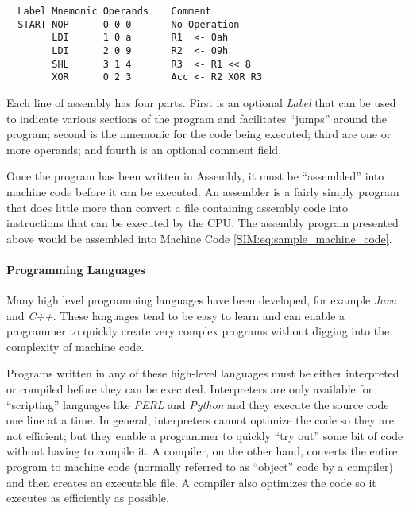 \begin{verbatim}
  Label Mnemonic Operands    Comment
  START NOP      0 0 0       No Operation
        LDI      1 0 a       R1  <- 0ah
        LDI      2 0 9       R2  <- 09h
        SHL      3 1 4       R3  <- R1 << 8
        XOR      0 2 3       Acc <- R2 XOR R3
\end{verbatim}

Each line of assembly has four parts. First is an optional \emph{Label} that can be used to indicate various sections of the program and facilitates ``jumps'' around the program; second is the mnemonic for the code being executed; third are one or more operands; and fourth is an optional comment field.


Once the program has been written in Assembly, it must be ``assembled'' into machine code before it can be executed. An assembler is a fairly simply program that does little more than convert a file containing assembly code into instructions that can be executed by the \ac{CPU}. The assembly program presented above would be assembled into Machine Code \ref{SIM:eq:sample_machine_code}.

\paragraph{Programming Languages}

Many high level programming languages have been developed, for example \emph{Java} and \emph{C++}. These languages tend to be easy to learn and can enable a programmer to quickly create very complex programs without digging into the complexity of machine code.

Programs written in any of these high-level languages must be either interpreted or compiled before they can be executed. Interpreters are only available for ``scripting'' languages like \emph{PERL} and \emph{Python} and they execute the source code one line at a time. In general, interpreters cannot optimize the code so they are not efficient; but they enable a programmer to quickly ``try out'' some bit of code without having to compile it. A compiler, on the other hand, converts the entire program to machine code (normally referred to as ``object'' code by a compiler) and then creates an executable file. A compiler also optimizes the code so it executes as efficiently as possible.

